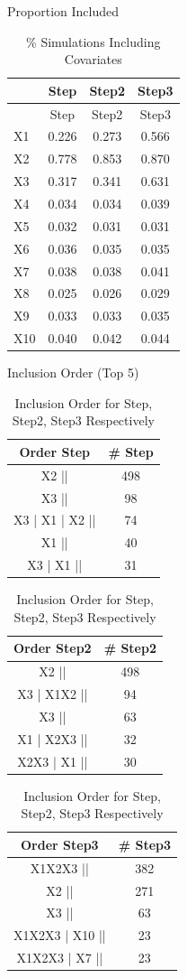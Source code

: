 \documentclass[ignorenonframetext,]{beamer}
\begin{document}
\begin{frame}{Proportion Included}

\begin{longtable}[]{@{}lccc@{}}
\caption{\% Simulations Including Covariates}\tabularnewline
\toprule
& Step & Step2 & Step3\tabularnewline
\midrule
\endfirsthead
\toprule
& Step & Step2 & Step3\tabularnewline
\midrule
\endhead
X1 & 0.226 & 0.273 & 0.566\tabularnewline
X2 & 0.778 & 0.853 & 0.870\tabularnewline
X3 & 0.317 & 0.341 & 0.631\tabularnewline
X4 & 0.034 & 0.034 & 0.039\tabularnewline
X5 & 0.032 & 0.031 & 0.031\tabularnewline
X6 & 0.036 & 0.035 & 0.035\tabularnewline
X7 & 0.038 & 0.038 & 0.041\tabularnewline
X8 & 0.025 & 0.026 & 0.029\tabularnewline
X9 & 0.033 & 0.033 & 0.035\tabularnewline
X10 & 0.040 & 0.042 & 0.044\tabularnewline
\bottomrule
\end{longtable}

\end{frame}

\begin{frame}{Inclusion Order (Top 5)}

\begin{table}
\caption{Inclusion Order for Step, Step2, Step3 Respectively}

\centering
\begin{tabular}[t]{c|c}
\hline
Order Step & \# Step\\
\hline
X2 || & 498\\
\hline
X3 || & 98\\
\hline
X3 | X1 | X2 || & 74\\
\hline
X1 || & 40\\
\hline
X3 | X1 || & 31\\
\hline
\end{tabular}
\centering
\begin{tabular}[t]{c|c}
\hline
Order Step2 & \# Step2\\
\hline
X2 || & 498\\
\hline
X3 | X1X2 || & 94\\
\hline
X3 || & 63\\
\hline
X1 | X2X3 || & 32\\
\hline
X2X3 | X1 || & 30\\
\hline
\end{tabular}
\centering
\begin{tabular}[t]{c|c}
\hline
Order Step3 & \# Step3\\
\hline
X1X2X3 || & 382\\
\hline
X2 || & 271\\
\hline
X3 || & 63\\
\hline
X1X2X3 | X10 || & 23\\
\hline
X1X2X3 | X7 || & 23\\
\hline
\end{tabular}
\end{table}

\end{frame}
\end{document}
